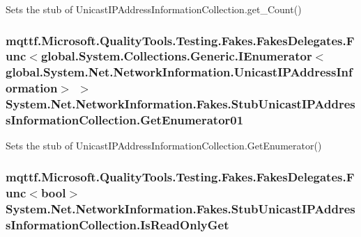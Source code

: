 Sets the stub of Unicast\-I\-P\-Address\-Information\-Collection.\-get\-\_\-\-Count()

\hypertarget{class_system_1_1_net_1_1_network_information_1_1_fakes_1_1_stub_unicast_i_p_address_information_collection_a12fc294ea8da1c53e81b4e8847047a49}{
\subsubsection[{Get\-Enumerator01}]{\setlength{\rightskip}{0pt plus 5cm}mqttf.\-Microsoft.\-Quality\-Tools.\-Testing.\-Fakes.\-Fakes\-Delegates.\-Func$<$global.\-System.\-Collections.\-Generic.\-I\-Enumerator$<$global.\-System.\-Net.\-Network\-Information.\-Unicast\-I\-P\-Address\-Information$>$ $>$ System.\-Net.\-Network\-Information.\-Fakes.\-Stub\-Unicast\-I\-P\-Address\-Information\-Collection.\-Get\-Enumerator01}}\label{class_system_1_1_net_1_1_network_information_1_1_fakes_1_1_stub_unicast_i_p_address_information_collection_a12fc294ea8da1c53e81b4e8847047a49}


Sets the stub of Unicast\-I\-P\-Address\-Information\-Collection.\-Get\-Enumerator()

\hypertarget{class_system_1_1_net_1_1_network_information_1_1_fakes_1_1_stub_unicast_i_p_address_information_collection_aac42c2d624f407ba9fb304ca6a2c5454}{
\subsubsection[{Is\-Read\-Only\-Get}]{\setlength{\rightskip}{0pt plus 5cm}mqttf.\-Microsoft.\-Quality\-Tools.\-Testing.\-Fakes.\-Fakes\-Delegates.\-Func$<$bool$>$ System.\-Net.\-Network\-Information.\-Fakes.\-Stub\-Unicast\-I\-P\-Address\-Information\-Collection.\-Is\-Read\-Only\-Get}}\label{class_system_1_1_net_1_1_network_information_1_1_fakes_1_1_stub_unicast_i_p_address_information_collection_aac42c2d624f407ba9fb304ca6a2c5454}


